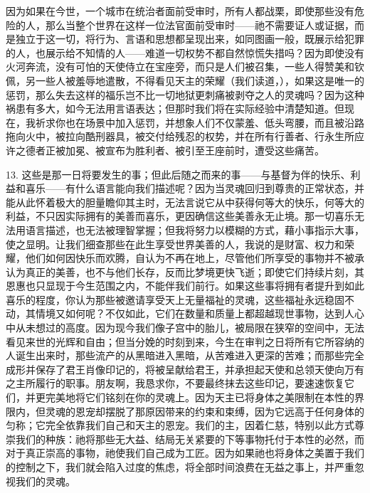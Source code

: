 因为如果在今世，一个城市在统治者面前受审时，所有人都战栗，即使那些没有危险的人，那么当整个世界在这样一位法官面前受审时——祂不需要证人或证据，而是独立于这一切，将行为、言语和思想都呈现出来，如同图画一般，既展示给犯罪的人，也展示给不知情的人——难道一切权势不都自然惊慌失措吗？因为即使没有火河奔流，没有可怕的天使侍立在宝座旁，而只是人们被召集，一些人得赞美和钦佩，另一些人被羞辱地遣散，不得看见天主的荣耀（我们读道，），如果这是唯一的惩罚，那么失去这样的福乐岂不比一切地狱更刺痛被剥夺之人的灵魂吗？因为这种祸患有多大，如今无法用言语表达；但那时我们将在实际经验中清楚知道。但现在，我祈求你也在场景中加入惩罚，并想象人们不仅蒙羞、低头弯腰，而且被沿路拖向火中，被拉向酷刑器具，被交付给残忍的权势，并在所有行善者、行永生所应许之德者正被加冕、被宣布为胜利者、被引至王座前时，遭受这些痛苦。\par

13. 这些是那一日将要发生的事；但此后随之而来的事——与基督为伴的快乐、利益和喜乐——有什么语言能向我们描述呢？因为当灵魂回归到尊贵的正常状态，并能从此怀着极大的胆量瞻仰其主时，无法言说它从中获得何等大的快乐，何等大的利益，不只因实际拥有的美善而喜乐，更因确信这些美善永无止境。那一切喜乐无法用语言描述，也无法被理智掌握；但我将努力以模糊的方式，藉小事指示大事，使之显明。让我们细查那些在此生享受世界美善的人，我说的是财富、权力和荣耀，他们如何因快乐而欢腾，自认为不再在地上，尽管他们所享受的事物并不被承认为真正的美善，也不与他们长存，反而比梦境更快飞逝；即使它们持续片刻，其恩惠也只显现于今生范围之内，不能伴我们前行。如果这些事将拥有者提升到如此喜乐的程度，你认为那些被邀请享受天上无量福祉的灵魂，这些福祉永远稳固不动，其情境又如何呢？不仅如此，它们在数量和质量上都超越现世事物，达到人心中从未想过的高度。因为现今我们像子宫中的胎儿，被局限在狭窄的空间中，无法看见来世的光辉和自由；但当分娩的时刻到来，今生在审判之日将所有它所容纳的人诞生出来时，那些流产的从黑暗进入黑暗，从苦难进入更深的苦难；而那些完全成形并保存了君王肖像印记的，将被呈献给君王，并承担起天使和总领天使向万有之主所履行的职事。朋友啊，我恳求你，不要最终抹去这些印记，要速速恢复它们，并更完美地将它们铭刻在你的灵魂上。因为天主已将身体之美限制在本性的界限内，但灵魂的恩宠却摆脱了那原因带来的约束和束缚，因为它远高于任何身体的匀称；它完全依靠我们自己和天主的恩宠。我们的主，因着仁慈，特别以此方式尊崇我们的种族：祂将那些无大益、结局无关紧要的下等事物托付于本性的必然，而对于真正崇高的事物，祂使我们自己成为工匠。因为如果祂也将身体之美置于我们的控制之下，我们就会陷入过度的焦虑，将全部时间浪费在无益之事上，并严重忽视我们的灵魂。\par

